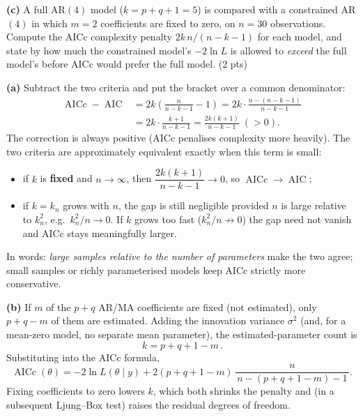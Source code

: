 \documentclass[11pt]{article}
\DeclareMathOperator{\AIC}{AIC}
\DeclareMathOperator{\AICc}{AICc}
\begin{document}
\textbf{(c)} A full AR$(4)$ model ($k=p+q+1=5$) is compared with a constrained AR$(4)$ in which $m=2$ coefficients are fixed to zero, on $n=30$ observations. Compute the AICc complexity penalty $2k\,n/(n-k-1)$ for each model, and state by how much the constrained model's $-2\ln L$ is allowed to \emph{exceed} the full model's before AICc would prefer the full model. \hfill(2 pts)
\statementend

\textbf{(a)} Subtract the two criteria and put the bracket over a common denominator:
\[
\begin{aligned}
\AICc-\AIC
&=2k\left(\frac{n}{n-k-1}-1\right)
=2k\cdot\frac{n-(n-k-1)}{n-k-1}\\
&=2k\cdot\frac{k+1}{n-k-1}
=\frac{2k(k+1)}{n-k-1}\;(>0).
\end{aligned}
\]
The correction is always positive (AICc penalises complexity more heavily). The two criteria are approximately equivalent exactly when this term is small:
\begin{itemize}
  \item if $k$ is \textbf{fixed} and $n\to\infty$, then $\dfrac{2k(k+1)}{n-k-1}\to0$, so $\AICc\to\AIC$;
  \item if $k=k_n$ grows with $n$, the gap is still negligible provided $n$ is large relative to $k_n^2$, e.g.\ $k_n^2/n\to0$. If $k$ grows too fast ($k_n^2/n\not\to0$) the gap need not vanish and AICc stays meaningfully larger.
\end{itemize}
In words: \emph{large samples relative to the number of parameters} make the two agree; small samples or richly parameterised models keep AICc strictly more conservative.

\textbf{(b)} If $m$ of the $p+q$ AR/MA coefficients are fixed (not estimated), only $p+q-m$ of them are estimated. Adding the innovation variance $\sigma^2$ (and, for a mean-zero model, no separate mean parameter), the estimated-parameter count is
\[
\boxed{\,k=p+q+1-m\,}.
\]
Substituting into the AICc formula,
\[
\AICc(\theta)=-2\ln L(\theta\mid y)
+2(p+q+1-m)\,\frac{n}{\,n-(p+q+1-m)-1\,}.
\]
Fixing coefficients to zero lowers $k$, which both shrinks the penalty and (in a subsequent Ljung--Box test) raises the residual degrees of freedom.
\end{document}
